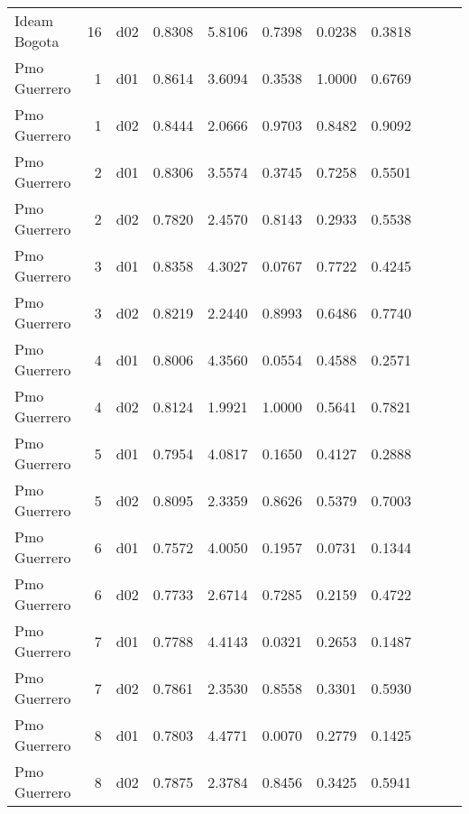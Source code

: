 \begin{landscape}
\begin{longtable}{p{2cm}rrrrrrrrrr}
            Ideam Bogota  &         16 &     d02 &   0.8308 &  5.8106 &        0.7398 &           0.0238 &  0.3818 \\
            Pmo Guerrero  &          1 &     d01 &   0.8614 &  3.6094 &        0.3538 &           1.0000 &  0.6769 \\
            Pmo Guerrero  &          1 &     d02 &   0.8444 &  2.0666 &        0.9703 &           0.8482 &  0.9092 \\
            Pmo Guerrero  &          2 &     d01 &   0.8306 &  3.5574 &        0.3745 &           0.7258 &  0.5501 \\
            Pmo Guerrero  &          2 &     d02 &   0.7820 &  2.4570 &        0.8143 &           0.2933 &  0.5538 \\
            Pmo Guerrero  &          3 &     d01 &   0.8358 &  4.3027 &        0.0767 &           0.7722 &  0.4245 \\
            Pmo Guerrero  &          3 &     d02 &   0.8219 &  2.2440 &        0.8993 &           0.6486 &  0.7740 \\
            Pmo Guerrero  &          4 &     d01 &   0.8006 &  4.3560 &        0.0554 &           0.4588 &  0.2571 \\
            Pmo Guerrero  &          4 &     d02 &   0.8124 &  1.9921 &        1.0000 &           0.5641 &  0.7821 \\
            Pmo Guerrero  &          5 &     d01 &   0.7954 &  4.0817 &        0.1650 &           0.4127 &  0.2888 \\
            Pmo Guerrero  &          5 &     d02 &   0.8095 &  2.3359 &        0.8626 &           0.5379 &  0.7003 \\
            Pmo Guerrero  &          6 &     d01 &   0.7572 &  4.0050 &        0.1957 &           0.0731 &  0.1344 \\
            Pmo Guerrero  &          6 &     d02 &   0.7733 &  2.6714 &        0.7285 &           0.2159 &  0.4722 \\
            Pmo Guerrero  &          7 &     d01 &   0.7788 &  4.4143 &        0.0321 &           0.2653 &  0.1487 \\
            Pmo Guerrero  &          7 &     d02 &   0.7861 &  2.3530 &        0.8558 &           0.3301 &  0.5930 \\
            Pmo Guerrero  &          8 &     d01 &   0.7803 &  4.4771 &        0.0070 &           0.2779 &  0.1425 \\
            Pmo Guerrero  &          8 &     d02 &   0.7875 &  2.3784 &        0.8456 &           0.3425 &  0.5941 \\

\end{longtable}
\end{landscape}
